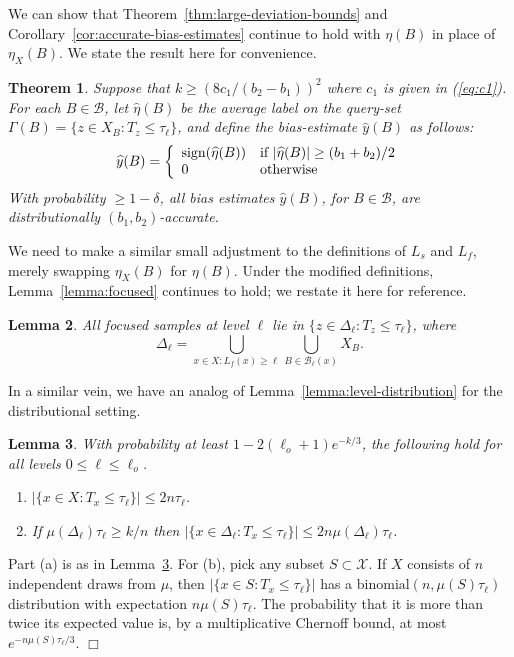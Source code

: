 \documentclass{article}
\def\X{{\mathcal X}}
\def\B{{\mathcal B}}
\def\yh{{\widehat{y}}}
\def\sign{{\rm sign}}
\newtheorem{thm}{Theorem}
\newtheorem{lemma}[thm]{Lemma}
\newenvironment{proof}{\noindent {\sc Proof:}}{$\Box$ \medskip}
\begin{document}
We can show that Theorem~\ref{thm:large-deviation-bounds} and Corollary~\ref{cor:accurate-bias-estimates} continue to hold with $\eta(B)$ in place of $\eta_X(B)$. We state the result here for convenience.
\begin{thm}
Suppose that $k \geq (8c_1/(b_2-b_1))^2$ where $c_1$ is given in (\ref{eq:c1}). 
For each $B \in \B$, let $\widehat{\eta}(B)$ be the average label on the query-set $\Gamma(B) = \{z \in X_B: T_z \leq \tau_\ell\}$, and define the bias-estimate $\yh(B)$ as follows:
$$ \yh(B)
= 
\left\{
\begin{array}{ll}
\sign(\widehat{\eta}(B)) & \mbox{if $|\widehat{\eta}(B)| \geq (b_1 + b_2)/2$} \\
0 & \mbox{otherwise}
\end{array}
\right.
$$
With probability $\geq 1-\delta$, all bias estimates $\yh(B)$, for $B \in \B$, are distributionally $(b_1,b_2)$-accurate.
\label{thm:accurate-bias-estimates-dist}
\end{thm}

We need to make a similar small adjustment to the definitions of $L_s$ and $L_f$, merely swapping $\eta_X(B)$ for $\eta(B)$. Under the modified definitions, Lemma~\ref{lemma:focused} continues to hold; we restate it here for reference.
\begin{lemma}
All focused samples at level $\ell$ lie in $\{z \in \Delta_\ell: T_z \leq \tau_\ell \}$, where
$$ \Delta_\ell = \bigcup_{x \in X: L_f(x) \geq \ell} \bigcup_{B \in \B_{\ell}(x)} X_B .$$
\label{lemma:focused-dist}
\end{lemma}

In a similar vein, we have an analog of Lemma~\ref{lemma:level-distribution} for the distributional setting.
\begin{lemma}
With probability at least $1-2(\ell_o+1)e^{-k/3}$, the following hold for all levels $0 \leq \ell \leq \ell_o$.
\begin{enumerate}
\item[(a)] $|\{x \in X: T_x \leq \tau_\ell\}| \leq 2 n \tau_\ell$.
\item[(b)] If $\mu(\Delta_\ell) \tau_\ell \geq k/n$ then $|\{x \in \Delta_{\ell}: T_x \leq \tau_\ell\}| \leq 2 n \mu(\Delta_\ell) \tau_\ell$.
\end{enumerate}
\label{lemma:level-distribution-dist}
\end{lemma}
\begin{proof} 
  Part (a) is as in Lemma~\ref{lemma:level-distribution-dist}. For (b), pick any subset $S \subset \X$. If $X$ consists of $n$ independent draws from $\mu$, then $|\{x \in S: T_x \leq \tau_\ell\}|$ has a $\mbox{binomial}(n, \mu(S) \tau_\ell)$ distribution with expectation $n \mu(S) \tau_\ell$. The probability that it is more than twice its expected value is, by a multiplicative Chernoff bound, at most $e^{-n \mu(S) \tau_\ell/3}$.
\end{proof}
\end{document}
